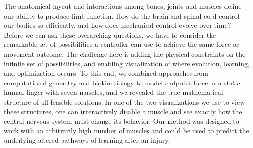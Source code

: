 The anatomical layout and interactions among bones, joints and muscles define our ability to produce limb function. How do the brain and spinal cord control our bodies so efficiently, and how does mechanical control evolve over time? Before we can ask these overarching questions, we have to consider the remarkable set of possibilities a controller can use to achieve the same force or movement outcome. The challenge here is adding the physical constraints on the infinite set of possibilities, and enabling visualization of where evolution, learning, and optimization occurs. To this end, we combined approaches from computational geometry and biokinesiology to model endpoint force in a static human finger with seven muscles, and we revealed the true mathematical structure of all feasible solutions. In one of the two visualizations we use to view these structures, one can interactively disable a muscle and see exactly how the central nervous system must change its behavior. Our method was designed to work with an arbitrarily high number of muscles and could be used to predict the underlying altered pathways of learning after an injury.
